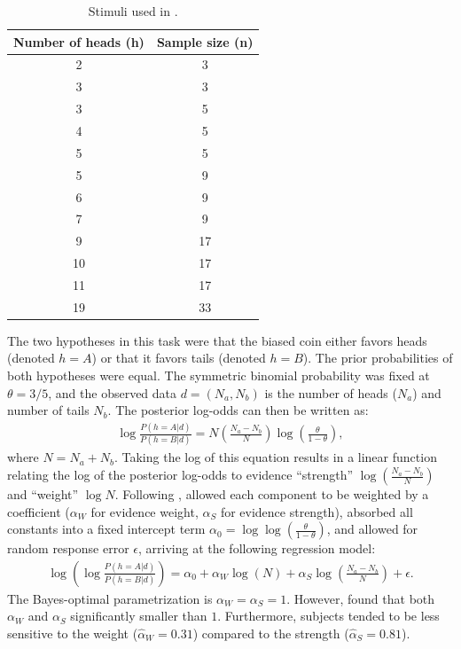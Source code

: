 \begin{table}
    \centering
    \begin{tabular}{c|c}
    \toprule
         Number of heads (h) & Sample size (n)\\
      \midrule
          2 & 3 \\
          3 & 3 \\
          3& 5\\
          4& 5\\
          5& 5\\
          5& 9\\
          6& 9\\
          7& 9\\
          9& 17\\
          10& 17\\
          11& 17\\
          19& 33\\
          \bottomrule
    \end{tabular}
    \caption{Stimuli used in \cite{griffin1992weighing}.}
    \label{tab:GT}
\end{table}

The two hypotheses in this task were that the biased coin either favors heads (denoted $h=A$) or that it favors tails (denoted $h=B$). The prior probabilities of both hypotheses were equal. The symmetric binomial probability was fixed at $\theta = 3/5$, and the observed data $d=(N_a,N_b)$ is the number of heads ($N_a$) and number of tails $N_b$. The posterior log-odds can then be written as:
\begin{align}
    \log \frac{P(h=A|d)}{P(h=B|d)} =  N \left(\frac{N_a - N_b}{N} \right) \log \left( \frac{\theta}{1-\theta}\right),
\end{align}
where $N = N_a + N_b$. Taking the log of this equation results in a linear function relating the log of the posterior log-odds to evidence ``strength'' $\log\left(\frac{N_a - N_b}{N}\right)$ and ``weight'' $\log N$. Following \citet{grether1980bayes}, \citet{griffin1992weighing} allowed each component to be weighted by a coefficient ($\alpha_W$ for evidence weight, $\alpha_S$ for evidence strength), absorbed all constants into a fixed intercept term $\alpha_0 = \log \log \left( \frac{\theta}{1-\theta} \right)$, and allowed for random response error $\epsilon$, arriving at the following regression model:
\begin{align}
    \log \left( \log \frac{P(h=A|d)}{P(h=B|d)} \right) = \alpha_0 + \alpha_W \log(N) + \alpha_S \log\left(\frac{N_a - N_b}{N} \right) + \epsilon.
\end{align}
The Bayes-optimal parametrization is $\alpha_W = \alpha_S = 1$. However, \citet{griffin1992weighing} found that both $\alpha_W$ and $\alpha_S$ significantly smaller than $1$. Furthermore, subjects tended to be less sensitive to the weight ($\hat{\alpha}_W = 0.31$) compared to the strength ($\hat{\alpha}_S = 0.81$).

